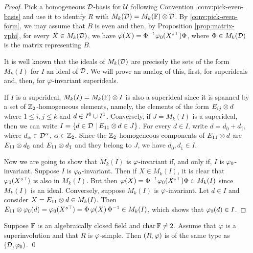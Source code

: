 \begin{proof}
	Pick a homogeneous $\mathcal{D}$-basis for $\mathcal U$ following Convention \ref{conv:pick-even-basis} and use it to identify $R$ with $M_k(\mathcal{D}) = M_k(\mathbb{F}) \otimes \mathcal{D}$.
	By \cref{conv:pick-even-form}, we may assume that $B$ is even and then,
	by Proposition \ref{prop:matrix-vphi}, for every $X \in M_k(\mathcal{D})$, we have
	$\varphi(X) = \Phi^{-1} \varphi_0(X^{s\top}) \Phi$, where $\Phi \in M_k(\mathcal{D})$ is the matrix representing $B$. 

	It is well known that the ideals of $M_k(\mathcal{D})$ are precisely the sets of the form $M_k(I)$ for $I$ an ideal of $\mathcal{D}$.
	We will prove an analog of this, first, for superideals and, then, for $\varphi$-invariant superideals.

	If $I$ is a superideal, $M_k(I) = M_k(\mathbb{F}) \otimes I$ is also a superideal since it is spanned by a set of $\mathbb{Z}_2$-homogeneous elements, namely, the elements of the form $E_{ij}\otimes d$ where $1 \leq i,j \leq k$ and $d \in I^{\bar0} \cup I^{\bar1}$.
	Conversely, if $J = M_k(I)$ is a superideal, then we can write $I = \{ d\in  \mathcal{D} \mid E_{11}\otimes d \in J\}$.
	For every $d\in I$, write $d = d_{\bar 0} + d_{\bar 1}$, where $d_\alpha \in \mathcal{D}^\alpha$, $\alpha \in \mathbb{Z}_2$.
	Since the $\mathbb{Z}_2$-homogeneous components of $E_{11}\otimes d$ are $E_{11}\otimes d_{\bar 0}$ and $E_{11}\otimes d_{\bar 1}$ and they belong to $J$, we have $d_{\bar 0}, d_{\bar 1} \in I$.

	Now we are going to show that $M_k(I)$ is $\varphi$-invariant if, and only if, $I$ is $\varphi_0$-invariant.
	Suppose $I$ is $\varphi_0$-invariant.
	Then if $X \in M_k(I)$, it is clear that $\varphi_0 (X^{s\top})$ is also in $M_k(I)$.
	But then $\varphi(X) = \Phi^{-1} \varphi_0(X^{s\top}) \Phi \in M_k(I)$ since $M_k(I)$ is an ideal.
	Conversely, suppose $M_k(I)$ is $\varphi$-invariant.
	Let $d \in I$ and consider $X = E_{11} \otimes d \in M_k(I)$.
	Then $E_{11} \otimes \varphi_0(d) = \varphi_0(X^{s\top}) = \Phi\, \varphi(X)\, \Phi^{-1} \in M_k(I)$, which shows that $\varphi_0(d) \in I$.
\end{proof}

\begin{cor}\label{cor:D-has-the-same-type}
	Suppose $\mathbb{F}$ is an algebraically closed field and $\operatorname{char} \mathbb{F} \neq 2$.
	Assume that $\varphi$ is a superinvolution and that $R$ is $\varphi$-simple.
	Then $(R, \varphi)$ is of the same type as $(\mathcal{D}, \varphi_0)$. \qed
\end{cor}

